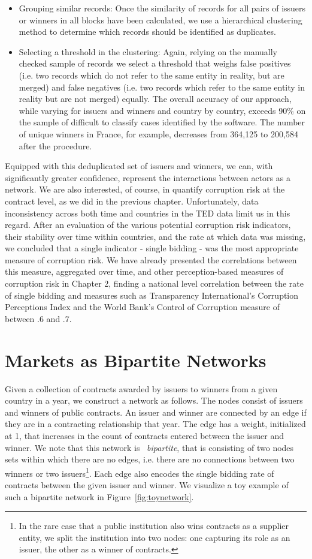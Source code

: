 \begin{itemize}
    \item Grouping similar records: Once the similarity of records for all pairs of issuers or winners in all blocks have been calculated, we use a hierarchical clustering method to determine which records should be identified as duplicates.
    \item Selecting a threshold in the clustering:  Again, relying on the manually checked sample of records we select a threshold that weighs false positives (i.e. two records which do not refer to the same entity in reality, but are merged) and false negatives (i.e. two records which refer to the same entity in reality but are not merged) equally. The overall accuracy of our approach, while varying for issuers and winners and country by country, exceeds 90\% on the sample of difficult to classify cases identified by the software. The number of unique winners in France, for example, decreases from 364,125  to 200,584 after the procedure.
\end{itemize}

Equipped with this deduplicated set of issuers and winners, we can, with significantly greater confidence, represent the interactions between actors as a network. We are also interested, of course, in quantify corruption risk at the contract level, as we did in the previous chapter. Unfortunately, data inconsistency across both time and countries in the TED data limit us in this regard. After an evaluation of the various potential corruption risk indicators, their stability over time within countries, and the rate at which data was missing, we concluded that a single indicator - single bidding - was the most appropriate measure of corruption risk. We have already presented the correlations between this measure, aggregated over time, and other perception-based measures of corruption risk in Chapter 2, finding a national level correlation between the rate of single bidding and measures such as Transparency International's Corruption Perceptions Index and the World Bank's Control of Corruption measure of between .6 and .7.


\section{Markets as Bipartite Networks}
Given a collection of contracts awarded by issuers to winners from a given country in a year, we construct a network as follows. The nodes consist of issuers and winners of public contracts. An issuer and winner are connected by an edge if they are in a contracting relationship that year. The edge has a weight, initialized at 1, that increases in the count of contracts entered between the issuer and winner. We note that this network is ~\textit{bipartite}, that is consisting of two nodes sets within which there are no edges, i.e. there are no connections between two winners or two issuers\footnote{In the rare case that a public institution also wins contracts as a supplier entity, we split the institution into two nodes: one capturing its role as an issuer, the other as a winner of contracts.}. Each edge also encodes the single bidding rate of contracts between the given issuer and winner. We visualize a toy example of such a bipartite network in Figure~\ref{fig:toynetwork}.

